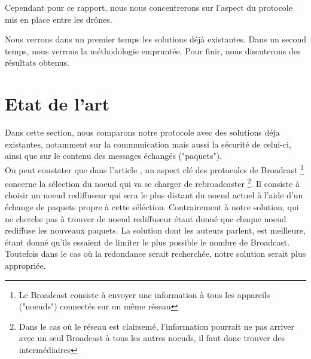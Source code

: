 \documentclass[journal, a4paper]{IEEEtran}
\begin{document}
        Cependant pour ce rapport, nous nous concentrerons sur l'aspect du protocole mis en place entre les drônes.

        Nous verrons dans un premier temps les solutions déjà existantes. Dans un second temps, nous verrons la méthodologie empruntée. Pour finir, nous discuterons des résultats obtenus.	  

\section{Etat de l'art}
        Dans cette section, nous comparons notre protocole avec des solutions déja existantes, notamment sur la communication mais aussi la sécurité de celui-ci, ainsi que sur le contenu des messages échangés ("paquets"). \\ 

        On peut constater que dans l'article \cite{WongdeethaiSingha2016Crti}, un aspect clé des protocoles de Broadcast \footnote{Le Broadcast consiste à envoyer une information à tous les appareils ("noeuds") connectés sur un même réseau} 
        concerne la sélection du noeud qui va se charger de rebroadcaster \footnote{Dans le cas où le réseau est clairsemé, l'information  pourrait ne pas arriver avec un seul Broadcast à tous les autres noeuds, il faut donc trouver des intermédiaires}. 
        Il consiste à choisir un noeud rediffuseur qui sera le plus distant du noeud actuel à l'aide d'un échange de paquets propre à cette séléction.
        Contrairement à notre solution, qui ne cherche pas à trouver de noeud rediffuseur étant donné que chaque noeud rediffuse les nouveaux paquets.
        La solution dont les auteurs parlent, est meilleure, étant donné qu'ils essaient de limiter le plus possible le nombre de Broadcast. Toutefois dans le cas où la redondance serait recherchée, notre solution serait plus appropriée. \\
\end{document}
